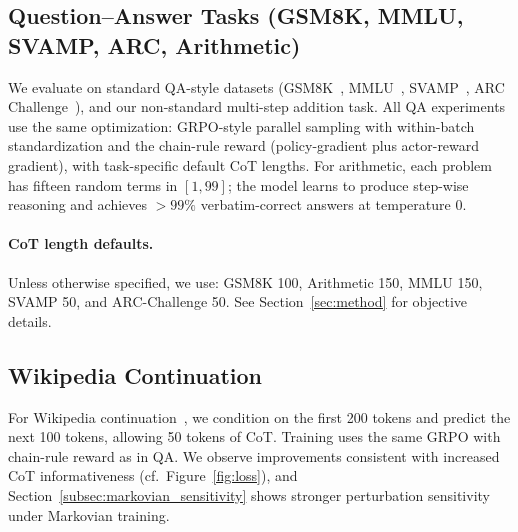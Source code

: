 \documentclass{article} %
\begin{document}
\subsection{Question–Answer Tasks (GSM8K, MMLU, SVAMP, ARC, Arithmetic)}
\label{subsec:qa}
We evaluate on standard QA-style datasets (GSM8K~\citep{cobbe2021gsm8k}, MMLU~\citep{hendrycks2020mmlu}, SVAMP~\citep{patel2021svamp}, ARC Challenge~\citep{clark2018arc}), and our non-standard multi-step addition task. All QA experiments use the same optimization: GRPO-style parallel sampling with within-batch standardization and the chain-rule reward (policy-gradient plus actor-reward gradient), with task-specific default CoT lengths. For arithmetic, each problem has fifteen random terms in $[1,99]$; the model learns to produce step-wise reasoning and achieves $>99\%$ verbatim-correct answers at temperature $0$.

\paragraph{CoT length defaults.} Unless otherwise specified, we use: GSM8K 100, Arithmetic 150, MMLU 150, SVAMP 50, and ARC-Challenge 50. See Section~\ref{sec:method} for objective details.

\subsection{Wikipedia Continuation}
\label{subsec:wikipedia}
For Wikipedia continuation~\citep{wikipediadump}, we condition on the first 200 tokens and predict the next 100 tokens, allowing 50 tokens of CoT. Training uses the same GRPO with chain-rule reward as in QA. We observe improvements consistent with increased CoT informativeness (cf.\ Figure~\ref{fig:loss}), and Section~\ref{subsec:markovian_sensitivity} shows stronger perturbation sensitivity under Markovian training.
\end{document}
